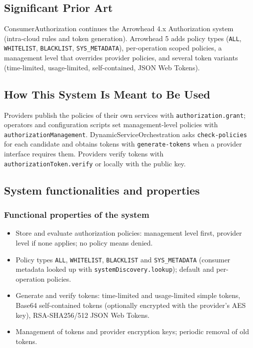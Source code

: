 \documentclass[a4paper]{arrowhead}
\begin{document}
\newpage

\subsection{Significant Prior Art}
\label{sec:prior_art}

Consumer\allowbreak{}Authorization continues the Arrowhead 4.x Authorization system (intra-cloud rules and token generation). Arrowhead 5 adds policy types (\texttt{ALL}, \texttt{WHITELIST}, \texttt{BLACKLIST}, \texttt{SYS\_\allowbreak{}METADATA}), per-operation scoped policies, a management level that overrides provider policies, and several token variants (time-limited, usage-limited, self-contained, JSON Web Tokens).

\subsection{How This System Is Meant to Be Used}
\label{sec:use}

Providers publish the policies of their own services with \texttt{authorization.\allowbreak{}grant}; operators and configuration scripts set management-level policies with \texttt{authorization\allowbreak{}Management}. Dynamic\allowbreak{}Service\allowbreak{}Orchestration asks \texttt{check-\allowbreak{}policies} for each candidate and obtains tokens with \texttt{generate-\allowbreak{}tokens} when a provider interface requires them. Providers verify tokens with \texttt{authorization\allowbreak{}Token.\allowbreak{}verify} or locally with the public key.

\subsection{System functionalities and properties}
\label{sec:properties}

\subsubsection{Functional properties of the system}

\begin{itemize}
  \item Store and evaluate authorization policies: management level first, provider level if none applies; no policy means denied.
  \item Policy types \texttt{ALL}, \texttt{WHITELIST}, \texttt{BLACKLIST} and \texttt{SYS\_\allowbreak{}METADATA} (consumer metadata looked up with \texttt{system\allowbreak{}Discovery.\allowbreak{}lookup}); default and per-operation policies.
  \item Generate and verify tokens: time-limited and usage-limited simple tokens, Base64 self-contained tokens (optionally encrypted with the provider's AES key), RSA-SHA256/512 JSON Web Tokens.
  \item Management of tokens and provider encryption keys; periodic removal of old tokens.
\end{itemize}
\end{document}
